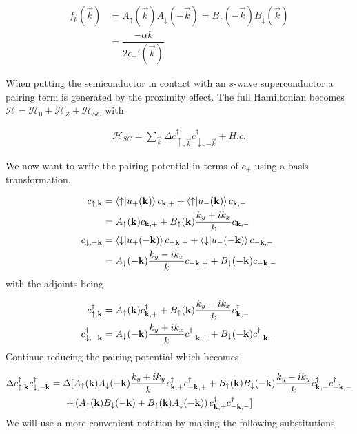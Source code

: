 \begin{align}
  f_p(\vec{k}) &= A_{\uparrow}(\vec{k})A_{\downarrow}(-\vec{k}) = B_{\uparrow}(-\vec{k})B_{\downarrow}(\vec{k}) \\
  &= \dfrac{-\alpha k}{2\epsilon_+'(\vec{k})}
\end{align}

When putting the semiconductor in contact with an $s$-wave superconductor a pairing term is generated by the proximity effect. The full Hamiltonian becomes $\mathcal{H} = \mathcal{H}_0 + \mathcal{H}_Z + \mathcal{H}_{SC}$ with

\begin{align}
  \mathcal{H}_{SC} = \sum_{\vec{k}} \Delta c_{\uparrow,\vec{k}}^\dagger c_{\downarrow,-\vec{k}}^\dagger + H.c.
\end{align}

We now want to write the pairing potential in terms of $c_{\pm}$ using a basis transformation.

\begin{align}
  c_{\uparrow,\mathbf{k}} &= \bra{\uparrow}\ket{u_+(\mathbf{k})} c_{\mathbf{k},+} + \bra{\uparrow}\ket{u_-(\mathbf{k})} c_{\mathbf{k},-} \\
  &= A_{\uparrow}(\mathbf{k}) c_{\mathbf{k},+} + B_{\uparrow}(\mathbf{k})\dfrac{k_y+i k_x}{k} c_{\mathbf{k},-} \\
  c_{\downarrow,-\mathbf{k}} &= \bra{\downarrow}\ket{u_+(-\mathbf{k})} c_{-\mathbf{k},+} + \bra{\downarrow}\ket{u_-(-\mathbf{k})} c_{-\mathbf{k},-} \\
  &= A_{\downarrow}(-\mathbf{k})\dfrac{k_y-i k_x}{k} c_{-\mathbf{k},+} + B_{\downarrow}(-\mathbf{k}) c_{-\mathbf{k},-}
\end{align}
with the adjoints being

\begin{align}
  c^{\dagger}_{\uparrow,\mathbf{k}} &= A_{\uparrow}(\mathbf{k}) c^{\dagger}_{\mathbf{k},+} + B_{\uparrow}(\mathbf{k})\dfrac{k_y-i k_x}{k} c^{\dagger}_{\mathbf{k},-} \\
  c^{\dagger}_{\downarrow,-\mathbf{k}} &= A_{\downarrow}(-\mathbf{k})\dfrac{k_y+i k_x}{k} c^{\dagger}_{-\mathbf{k},+} + B_{\downarrow}(-\mathbf{k}) c^{\dagger}_{-\mathbf{k},-}
\end{align}
Continue reducing the pairing potential which becomes

\begin{equation}
  \begin{split}
    \Delta c^{\dagger}_{\uparrow,\mathbf{k}} c^{\dagger}_{\downarrow,-\mathbf{k}} = \Delta [ & A_{\uparrow}(\mathbf{k})A_{\downarrow}(-\mathbf{k})\dfrac{k_y+i k_y}{k} c^{\dagger}_{\mathbf{k},+} c^{\dagger}_{-\mathbf{k},+} + B_{\uparrow}(\mathbf{k})B_{\downarrow}(-\mathbf{k})\dfrac{k_y-i k_y}{k} c^{\dagger}_{\mathbf{k},-} c^{\dagger}_{-\mathbf{k},-} \\
  + & \left(A_{\uparrow}(\mathbf{k})B_{\downarrow}(-\mathbf{k})+B_{\uparrow}(\mathbf{k})A_{\downarrow}(-\mathbf{k}) \right) c^{\dagger}_{\mathbf{k},+} c^{\dagger}_{-\mathbf{k},-} ]
  \end{split}
\end{equation}
We will use a more convenient notation by making the following substitutions

